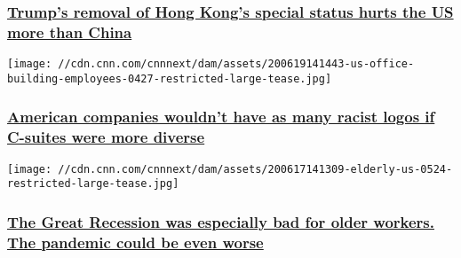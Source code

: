 \hypertarget{trumps-removal-of-hong-kongs-special-status-hurts-the-us-more-than-china}{%
\subsubsection{\texorpdfstring{\href{/2020/06/22/perspectives/hong-kong-special-status-trump/index.html}{Trump's
removal of Hong Kong's special status hurts the US more than
China}}{Trump's removal of Hong Kong's special status hurts the US more than China}}\label{trumps-removal-of-hong-kongs-special-status-hurts-the-us-more-than-china}}

\href{/2020/06/20/perspectives/aunt-jemima-racist-logos/index.html}{}

\texttt{[image: //cdn.cnn.com/cnnnext/dam/assets/200619141443-us-office-building-employees-0427-restricted-large-tease.jpg]}

\hypertarget{american-companies-wouldnt-have-as-many-racist-logos-if-c-suites-were-more-diverse}{%
\subsubsection{\texorpdfstring{\href{/2020/06/20/perspectives/aunt-jemima-racist-logos/index.html}{American
companies wouldn't have as many racist logos if C-suites were more
diverse}}{American companies wouldn't have as many racist logos if C-suites were more diverse}}\label{american-companies-wouldnt-have-as-many-racist-logos-if-c-suites-were-more-diverse}}

\href{/2020/06/18/perspectives/pandemic-older-workers/index.html}{}

\texttt{[image: //cdn.cnn.com/cnnnext/dam/assets/200617141309-elderly-us-0524-restricted-large-tease.jpg]}

\hypertarget{the-great-recession-was-especially-bad-for-older-workers-the-pandemic-could-be-even-worse}{%
\subsubsection{\texorpdfstring{\href{/2020/06/18/perspectives/pandemic-older-workers/index.html}{The
Great Recession was especially bad for older workers. The pandemic could
be even
worse}}{The Great Recession was especially bad for older workers. The pandemic could be even worse}}\label{the-great-recession-was-especially-bad-for-older-workers-the-pandemic-could-be-even-worse}}

\href{/2020/06/16/perspectives/housing-market-pandemic/index.html}{}

